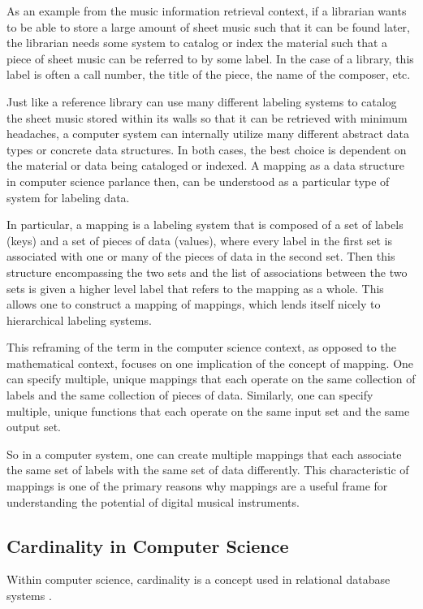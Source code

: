 As an example from the music information retrieval context, if a librarian wants to be able to store a large amount of sheet music such that it can be found later, the librarian needs some system to catalog or index the material such that a piece of sheet music can be referred to by some label. In the case of a library, this label is often a call number, the title of the piece, the name of the composer, etc.

Just like a reference library can use many different labeling systems to catalog the sheet music stored within its walls so that it can be retrieved with minimum headaches, a computer system can internally utilize many different abstract data types or concrete data structures. In both cases, the best choice is dependent on the material or data being cataloged or indexed. A mapping as a data structure in computer science parlance then, can be understood as a particular type of system for labeling data.

In particular, a mapping is a labeling system that is composed of a set of labels (keys) and a set of pieces of data (values), where every label in the first set is associated with one or many of the pieces of data in the second set. Then this structure encompassing the two sets and the list of associations between the two sets is given a higher level label that refers to the mapping as a whole. This allows one to construct a mapping of mappings, which lends itself nicely to hierarchical labeling systems.

This reframing of the term in the computer science context, as opposed to the mathematical context, focuses on one implication of the concept of mapping. One can specify multiple, unique mappings that each operate on the same collection of labels and the same collection of pieces of data. Similarly, one can specify multiple, unique functions that each operate on the same input set and the same output set. 

So in a computer system, one can create multiple mappings that each associate the same set of labels with the same set of data differently. This characteristic of mappings is one of the primary reasons why mappings are a useful frame for understanding the potential of digital musical instruments. 

\subsection{Cardinality in Computer Science}

Within computer science, cardinality is a concept used in relational database systems \cite{carddata1987}. 

